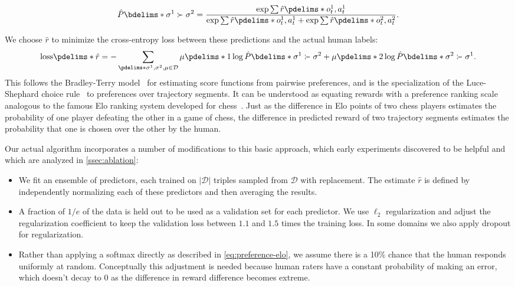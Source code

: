 \begin{equation}\label{eq:preference-elo}
\hat{P}\bdelims*{\sigma^1 \succ \sigma^2} =
\frac{\exp{\sum \hat{r}\pdelims*{o^1_t, a^1_t}}}{\exp{\sum\hat{r}\pdelims*{o^1_t, a^1_t}} + \exp{\sum\hat{r}\pdelims*{o^2_t, a^2_t}}}.
\end{equation}

We choose $\hat{r}$ to minimize the cross-entropy loss between these predictions and the actual human labels:
\[
  \mathrm{loss}\pdelims*{\hat{r}}
= -\sum_{\pdelims*{\sigma^1, \sigma^2, \mu} \in \mathcal{D}} \mu\pdelims*{1} \log \hat{P}\bdelims*{\sigma^1 \succ \sigma^2}
                                            + \mu\pdelims*{2} \log \hat{P}\bdelims*{\sigma^2 \succ \sigma^1}.
\]
This follows the Bradley-Terry model~\citep{Bradley52} for estimating score functions from pairwise preferences, and is the specialization of the Luce-Shephard choice rule~\citep{Luce05, Shepard57} to preferences over trajectory segments. It can be understood as equating rewards with a preference ranking scale analogous to the famous Elo ranking system developed for chess~\citep{Elo78}. Just as the difference in Elo points of two chess players estimates the probability of one player defeating the other in a game of chess, the difference in predicted reward of two trajectory segments estimates the probability that one is chosen over the other by the human.

Our actual algorithm incorporates a number of modifications to this basic approach, which early experiments discovered to be helpful and which are analyzed in \autoref{ssec:ablation}:

\begin{itemize}
\item We fit an ensemble of predictors, each trained on $\left|\mathcal{D}\right|$ triples sampled from $\mathcal{D}$ with replacement. The estimate $\hat{r}$ is defined by independently normalizing each of these predictors and then averaging the results.
\item A fraction of $1/e$ of the data is held out to be used as a validation set for each predictor. We use $\ell_2$ regularization and adjust the regularization coefficient to keep the validation loss between $1.1$ and $1.5$ times the training loss. In some domains we also apply dropout for regularization.
\item Rather than applying a softmax directly as described in \autoref{eq:preference-elo},
    we assume there is a 10\% chance that the human responds uniformly at random. Conceptually this adjustment is needed because human raters have a constant probability of making an error, which doesn't decay to 0 as the difference in reward difference becomes extreme.
\end{itemize}

